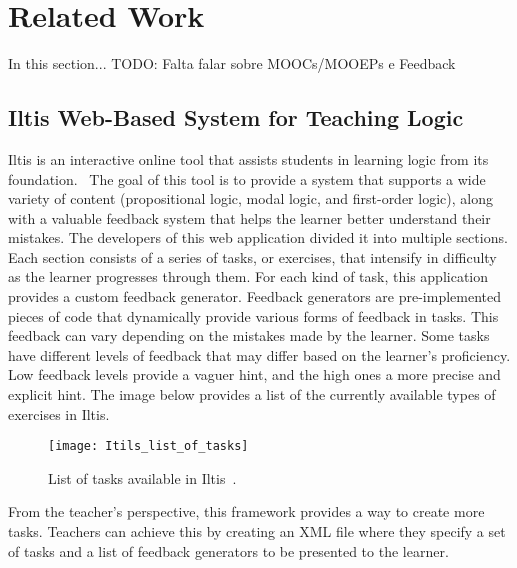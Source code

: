 
%

\chapter{Related Work}

In this section...
TODO: Falta falar sobre MOOCs/MOOEPs e Feedback

\section{Iltis Web-Based System for Teaching Logic}
\label{chap:iltis}

Iltis is an interactive online tool that assists students in learning logic from its foundation.~\cite{arxivIltisLearning, arxiv} The goal of this tool is to provide a system that supports a wide variety of content (propositional logic, modal logic, and first-order logic), along with a valuable feedback system that helps the learner better understand their mistakes. The developers of this web application divided it into multiple sections. Each section consists of a series of tasks, or exercises, that intensify in difficulty as the learner progresses through them. For each kind of task, this application provides a custom feedback generator. Feedback generators are pre-implemented pieces of code that dynamically provide various forms of feedback in tasks. This feedback can vary depending on the mistakes made by the learner. Some tasks have different levels of feedback that may differ based on the learner’s proficiency. Low feedback levels provide a vaguer hint, and the high ones a more precise and explicit hint. The image below provides a list of the currently available types of exercises in Iltis.

\begin{figure}[htbp]
    \centering
    \texttt{[image: Itils\_list\_of\_tasks]}
    \caption{List of tasks available in Iltis~\cite{arxiv}.}
\end{figure}

From the teacher’s perspective, this framework provides a way to create more tasks. Teachers can achieve this by creating an XML file where they specify a set of tasks and a list of feedback generators to be presented to the learner.

